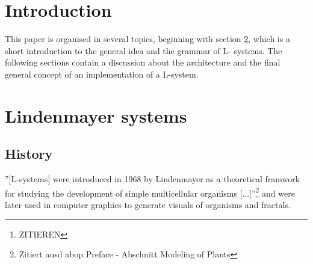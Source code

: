 \documentclass[english]{cpp-hmwk}
\begin{document}

\begin{abstract}
Lindenmayer Systems, short L-systems, are the result of \textbf{research from Lindenmayer et al.}\footnote{ZITIEREN} about the geometric features of plants.
L-systems are a concept to mathematicaly describe and model the growth processes of plant development. They are not only restricted to the plant based developments, but they can also be used to generate fractals.

L-systems start with a defined state and use rules, like a formal grammar, to transform the current state to create the next state of the development or the fractal.
It is therefore possible to successive calculate each state of the development of a plant or a fractal.
Such a state of a L-system can be interpreted as commands for a turtle graphic, which creates the opportunity to draw the created fractals or plant states. 

Goal of this paper is to design an architecture for L-systems, which includes an implementation for L-systems, their creation and an interface for a turtle graphic. The interface should enable the polymorphic use of different turtle graphic implementations. 
\end{abstract}

\pagebreak
\section{Introduction}


This paper is organised in several topics, beginning with section \ref{section:lindenmayer}, which is a short introduction to the general idea and the grammar of L- systems.
The following sections contain a discussion about the architecture and the final general concept of an implementation of a L-system.




\pagebreak
\section{Lindenmayer systems}
\label{section:lindenmayer}
\subsection{History}
''[L-systems] were introduced in 1968 by Lindenmayer as a theoretical framwork for studying the development of simple multicellular organisms [...]''\footnote{Zitiert ausd abop Preface - Abschnitt Modeling of Plants} and were later used in computer graphics to generate visuals of organisms and fractals.
\end{document}

